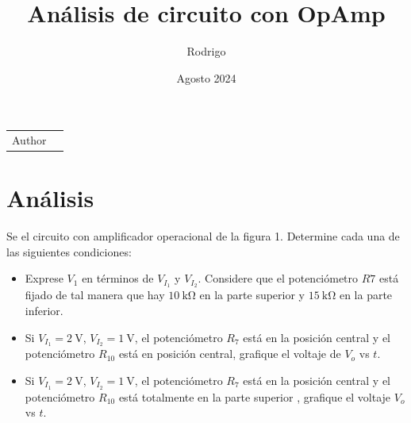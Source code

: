 \documentclass{article}
\title{Análisis de circuito con OpAmp}
\author{Rodrigo}
\date{Agosto 2024}
\begin{document}
	
	\maketitle
	
	\noindent\begin{tabular}{@{}ll}
		Author & \theauthor\\

	\end{tabular}

	
	\section*{Análisis}
Se el circuito con amplificador operacional de la figura 1. Determine cada una de las siguientes condiciones:

\begin{itemize}
	\item Exprese $V_1$ en términos de $V_{I_1}$ y $V_{I_2}$. Considere que el potenciómetro $R7$ está fijado de tal manera que hay $\qty{10}{\kilo \ohm}$ en la parte superior y $\qty{15}{\kilo \ohm}$ en la parte inferior.
	\item Si $V_{I_1} = \qty{2}{\volt}$, $V_{I_2} = \qty{1}{\volt}$, el potenciómetro $R_7$ está en la posición central y el potenciómetro $R_{10}$ está en posición central, grafique el voltaje de $V_o$ vs $t$.
	\item  Si $V_{I_1} = \qty{2}{\volt}$, $V_{I_2} = \qty{1}{\volt}$, el potenciómetro $R_7$ está en la posición central y el potenciómetro $R_{10}$ está totalmente en la parte superior , grafique el voltaje $V_o$ vs $t$.
\end{itemize}
\end{document}
